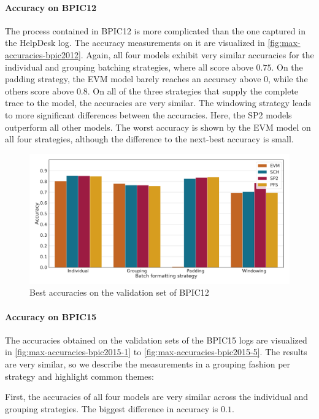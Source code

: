 \paragraph{Accuracy on BPIC12}
The process contained in BPIC12 is more complicated than the one captured in the HelpDesk log.
The accuracy measurements on it are visualized in \autoref{fig:max-accuracies-bpic2012}.
Again, all four models exhibit very similar accuracies for the individual and grouping batching strategies, where all score above $0.75$.
On the padding strategy, the EVM model barely reaches an accuracy above $0$, while the others score above $0.8$.
On all of the three strategies that supply the complete trace to the model, the accuracies are very similar.
The windowing strategy leads to more significant differences between the accuracies.
Here, the SP2 models outperform all other models.
The worst accuracy is shown by the EVM model on all four strategies, although the difference to the next-best accuracy is small.

\begin{figure}
    \centering
    \includegraphics[width=\textwidth]{gfx/bpic2012/accuracies.pdf}
    \caption{Best accuracies on the validation set of BPIC12}
    \label{fig:max-accuracies-bpic2012}
\end{figure}
\FloatBarrier

\paragraph{Accuracy on BPIC15}
The accuracies obtained on the validation sets of the BPIC15 logs are visualized in \autoref{fig:max-accuracies-bpic2015-1} to \autoref{fig:max-accuracies-bpic2015-5}.
The results are very similar, so we describe the measurements in a grouping fashion per strategy and highlight common themes:

First, the accuracies of all four models are very similar across the individual and grouping strategies.
The biggest difference in accuracy is $0.1$.

